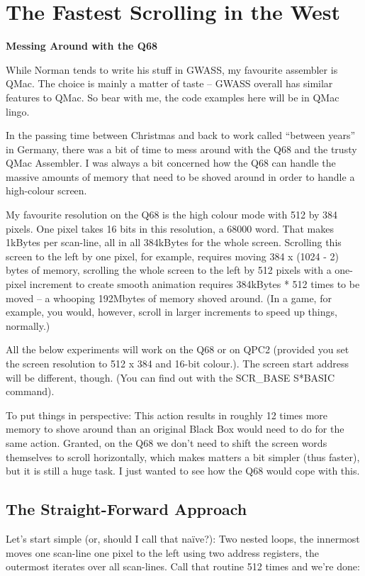 \chapter{The Fastest Scrolling in the West}

\textbf{Messing Around with the Q68}

While Norman tends to write his stuff in GWASS, my favourite assembler is
QMac. The choice is mainly a matter of taste -- GWASS overall has
similar features to QMac. So bear with me, the code examples here will
be in QMac lingo.

In the passing time between Christmas and back to work called ``between
years'' in Germany, there was a bit of time to mess around with the Q68
and the trusty QMac Assembler. I was always a bit concerned how the Q68
can handle the massive amounts of memory that need to be shoved around
in order to handle a high-colour screen.

My favourite resolution on the Q68 is the high colour mode with 512 by 384
pixels. One pixel takes 16 bits in this resolution, a 68000 word. That
makes 1kBytes per scan-line, all in all 384kBytes for the whole screen.
Scrolling this screen to the left by one pixel, for example, requires
moving 384 x (1024 - 2) bytes of memory, scrolling the whole screen to
the left by 512 pixels with a one-pixel increment to create smooth
animation requires 384kBytes * 512 times to be moved -- a whooping
192Mbytes of memory shoved around. (In a game, for example, you would,
however, scroll in larger increments to speed up things, normally.)

All the below experiments will work on the Q68 or on QPC2 (provided you
set the screen resolution to 512 x 384 and 16-bit colour.). The screen
start address will be different, though. (You can find out with the
SCR\_BASE S*BASIC command).

To put things in perspective: This action results in roughly 12 times
more memory to shove around than an original Black Box would need to do
for the same action. Granted, on the Q68 we don't need to shift the
screen words themselves to scroll horizontally, which makes matters a
bit simpler (thus faster), but it is still a huge task. I just wanted to
see how the Q68 would cope with this.

\section{The Straight-Forward Approach}

Let's start simple (or, should I call that naïve?): Two nested loops,
the innermost moves one scan-line one pixel to the left using two address
registers, the outermost iterates over all scan-lines. Call that routine
512 times and we're done:

